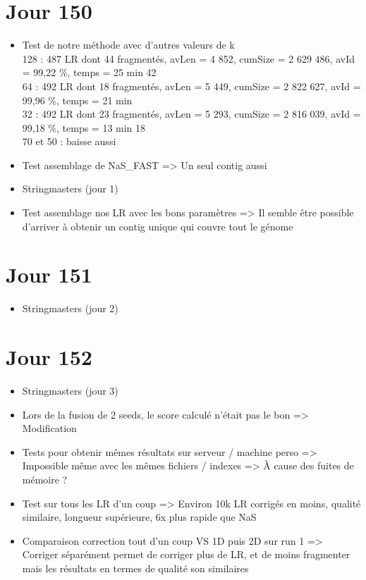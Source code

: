\documentclass[12pt]{report}
\begin{document}
\section{Jour 150}

\begin{itemize}
	\item Test de notre méthode avec d'autres valeurs de k \\
		 128 : 487 LR dont 44 fragmentés, avLen = 4 852, cumSize = 2 629 486, avId = 99,22 \%, temps = 25 min 42 \\
		  64 : 492 LR dont 18 fragmentés, avLen = 5 449, cumSize = 2 822 627, avId = 99,96 \%, temps = 21 min\\
		  32 : 492 LR dont 23 fragmentés, avLen = 5 293, cumSize = 2 816 039, avId = 99,18 \%, temps = 13 min 18 \\
		  70 et 50 : baisse aussi
	
	\item Test assemblage de NaS_FAST => Un seul contig aussi
	
	\item Stringmasters (jour 1)

	\item Test assemblage nos LR avec les bons paramètres => Il semble être possible d'arriver à obtenir un contig unique qui couvre tout le génome
\end{itemize}

\section{Jour 151}

\begin{itemize}
	\item Stringmasters (jour 2)
\end{itemize}

\section{Jour 152}

\begin{itemize}
	\item Stringmasters (jour 3)
	
	\item Lors de la fusion de 2 seeds, le score calculé n'était pas le bon => Modification
	
	\item Tests pour obtenir mêmes résultats sur serveur / machine perso => Impossible même avec les mêmes fichiers / indexes
		  => À cause des fuites de mémoire ?
		  
	\item Test sur tous les LR d'un coup => Environ 10k LR corrigés en moins, qualité similaire, longueur supérieure, 6x plus rapide que NaS
	
	\item Comparaison correction tout d'un coup VS 1D puis 2D sur run 1 => Corriger séparément permet de corriger plus de LR, et de moins fragmenter
		  mais les résultats en termes de qualité son similaires
\end{itemize}
\end{document}
